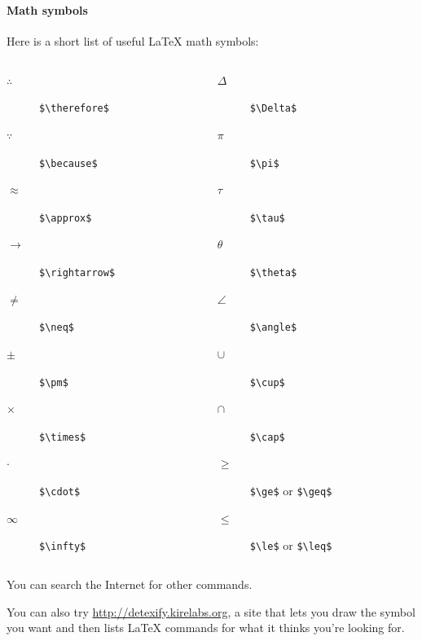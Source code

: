 \documentclass{beamer}
\begin{document}
	\begin{frame}[fragile]
		\frametitle{\secname}
		\framesubtitle{Math symbols}
		Here is a short list of useful \LaTeX{} math symbols:
		\begin{center}
			\begin{columns}
				\begin{column}{0.5\textwidth}
					\begin{description}
						\item[$\therefore$] \lstinline{$\therefore$}
						\item[$\because$] \lstinline{$\because$}
						\item[$\approx$] \lstinline{$\approx$}
						\item[$\rightarrow$] \lstinline{$\rightarrow$}
						\item[$\neq$] \lstinline{$\neq$}
						\item[$\pm$] \lstinline{$\pm$}
						\item[$\times$] \lstinline{$\times$}
						\item[$\cdot$] \lstinline{$\cdot$}
						\item[$\infty$] \lstinline{$\infty$}
					\end{description}
				\end{column}
				\begin{column}{0.5\textwidth}
					\begin{description}
						\item[$\Delta$] \lstinline{$\Delta$}
						\item[$\pi$] \lstinline{$\pi$}
						\item[$\tau$] \lstinline{$\tau$}
						\item[$\theta$] \lstinline{$\theta$}
						\item[$\angle$] \lstinline{$\angle$}
						\item[$\cup$] \lstinline{$\cup$}
						\item[$\cap$] \lstinline{$\cap$}
						\item[$\geq$] \lstinline{$\ge$} or \lstinline{$\geq$}
						\item[$\leq$] \lstinline{$\le$} or \lstinline{$\leq$}
					\end{description}
				\end{column}
			\end{columns}
		\end{center}
		You can search the Internet for other commands.

		You can also try \url{http://detexify.kirelabs.org}, a site that lets you draw the symbol you want and then lists \LaTeX{} commands for what it thinks you're looking for.
	\end{frame}
\end{document}
